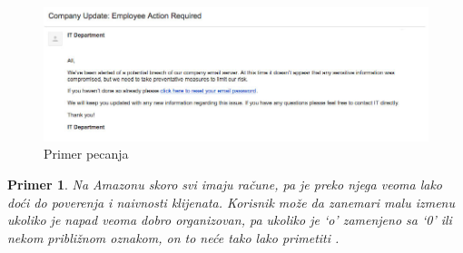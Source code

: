 \documentclass[a4paper]{article}
\newtheorem{primer}{Primer}[section]
\begin{document}
\begin{itemize}
\begin{figure}[h!]
	\begin{center}
		\includegraphics[scale=0.4]{msnr_phishing.jpg}
	\end{center}
	\caption{Primer pecanja }
	\label{fig:phishing}
\end{figure}

\begin{primer}
Na Amazonu skoro svi imaju račune, pa je preko njega veoma lako doći do poverenja i naivnosti klijenata. Korisnik može da zanemari malu izmenu ukoliko je napad veoma dobro organizovan, pa ukoliko je ‘o’ zamenjeno sa ‘0’ ili nekom približnom oznakom, on to neće tako lako primetiti \cite{6exp}.
\end{primer}


\end{itemize}
\end{document}
